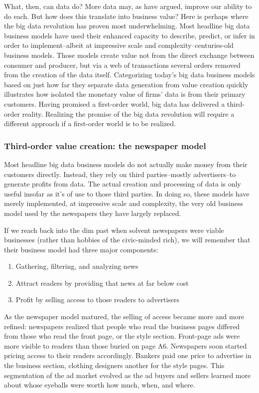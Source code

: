 \documentclass[12pt]{article}
\begin{document}
What, then, can data do? More data may, as
\cite{halevy2009unreasonable} have argued, improve our ability to do
each. But how does this translate into business value? Here is perhaps
where the big data revolution has proven most underwhelming. Most
headline big data business models have used their enhanced capacity to
describe, predict, or infer in order to implement--albeit at
impressive scale and complexity--centuries-old business models. Those
models create value not from the direct exchange between consumer and
producer, but via a web of transactions several orders removed from
the creation of the data itself. Categorizing today's big data
business models based on just how far they separate data generation
from value creation quickly illustrates how isolated the monetary
value of firms' data is from their primary customers. Having promised
a first-order world, big data has delivered a third-order
reality. Realizing the promise of the big data revolution will require
a different approach if a first-order world is to be realized.


\subsubsection{Third-order value creation: the newspaper model}
\label{sec:third-order-value}

Most headline big data business models do not actually make money from
their customers directly. Instead, they rely on third parties--mostly
advertisers--to generate profits from data. The actual creation and
processing of data is only useful insofar as it's of use to those
third parties. In doing so, these models have merely implemented, at
impressive scale and complexity, the very old business model used by
the newspapers they have largely replaced.

If we reach back into the dim past when solvent newspapers were viable
businesses (rather than hobbies of the civic-minded rich), we will
remember that their business model had three major components:

\begin{enumerate}
\item Gathering, filtering, and analyzing news
\item Attract readers by providing that news at far below cost
\item Profit by selling access to those readers to advertisers
\end{enumerate}

As the newspaper model matured, the selling of access became more and
more refined: newspapers realized that people who read the business
pages differed from those who read the front page, or the style
section. Front-page ads were more visible to readers than those buried
on page A6. Newspapers soon started pricing access to their readers
accordingly. Bankers paid one price to advertise in the business
section, clothing designers another for the style pages. This
segmentation of the ad market evolved as the ad buyers and sellers
learned more about whose eyeballs were worth how much, when, and
where.
\end{document}
